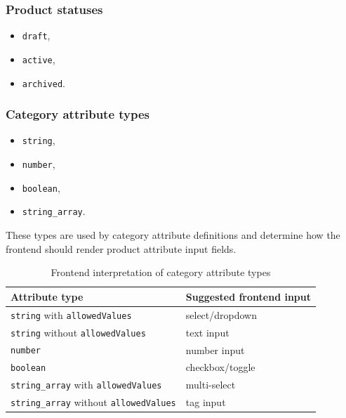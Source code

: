 \subsubsection{Product statuses}

\begin{itemize}
    \item \texttt{draft},
    \item \texttt{active},
    \item \texttt{archived}.
\end{itemize}

\subsubsection{Category attribute types}

\begin{itemize}
    \item \texttt{string},
    \item \texttt{number},
    \item \texttt{boolean},
    \item \texttt{string\_array}.
\end{itemize}

These types are used by category attribute definitions and determine how the frontend should render product attribute input fields.

\begin{table}[H]
    \centering
    \begin{tabular}{|l|l|}
        \hline
        \textbf{Attribute type}                               & \textbf{Suggested frontend input} \\
        \hline
        \texttt{string} with \texttt{allowedValues}           & select/dropdown                   \\
        \texttt{string} without \texttt{allowedValues}        & text input                        \\
        \texttt{number}                                       & number input                      \\
        \texttt{boolean}                                      & checkbox/toggle                   \\
        \texttt{string\_array} with \texttt{allowedValues}    & multi-select                      \\
        \texttt{string\_array} without \texttt{allowedValues} & tag input                         \\
        \hline
    \end{tabular}
    \caption{Frontend interpretation of category attribute types}
\end{table}

